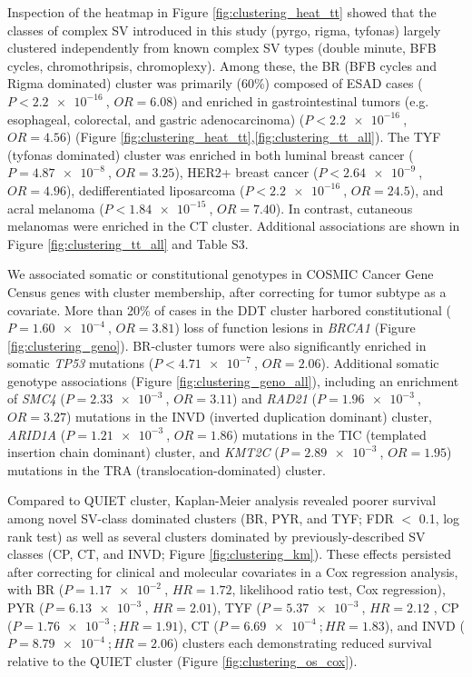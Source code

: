 \documentclass[phd,tocprelim]{cornell}
\begin{document}
Inspection of the heatmap in Figure \ref{fig:clustering_heat_tt} showed that the classes of complex SV introduced in this study (pyrgo, rigma, tyfonas) largely clustered independently from known complex SV types (double minute, BFB cycles, chromothripsis, chromoplexy). Among these, the BR (BFB cycles and Rigma dominated) cluster was primarily (60\%) composed of ESAD cases ($P < \SI{2.2e-16}{}$, $OR = 6.08$) and enriched in gastrointestinal tumors (e.g. esophageal, colorectal, and gastric adenocarcinoma) ($P < \SI{2.2e-16}{}$, $OR = 4.56$) (Figure \ref{fig:clustering_heat_tt},\ref{fig:clustering_tt_all}). The TYF (tyfonas dominated) cluster was enriched in both luminal breast cancer ($P = \SI{4.87e-8}{}$, $OR = 3.25$),  HER2+ breast cancer ($P < \SI{2.64e-9}{}$, $OR = 4.96$), dedifferentiated liposarcoma ($P < \SI{2.2e-16}{}$, $OR = 24.5$), and acral melanoma ($P < \SI{1.84e-15}{}$, $OR = 7.40$). In contrast, cutaneous melanomas were enriched in the CT cluster.  Additional associations are shown in Figure \ref{fig:clustering_tt_all} and \cite{Hadi2020-um} Table S3.

We associated somatic or constitutional genotypes in COSMIC Cancer Gene Census genes with cluster membership, after correcting for tumor subtype as a covariate. More than 20\% of cases in the DDT cluster harbored constitutional ($P = \SI{1.60e-4}{}$, $OR = 3.81$) loss of function lesions in \textit{BRCA1} (Figure \ref{fig:clustering_geno}). BR-cluster tumors were also significantly enriched in somatic \textit{TP53} mutations ($P < \SI{4.71e-7}{}$, $OR = 2.06$). Additional somatic genotype associations (Figure \ref{fig:clustering_geno_all}), including an enrichment of \textit{SMC4} ($P = \SI{2.33e-3}{}$, $OR = 3.11$) and \textit{RAD21} ($P = \SI{1.96e-3}{}$, $OR = 3.27$) mutations in the INVD (inverted duplication dominant) cluster, \textit{ARID1A} ($P = \SI{1.21e-3}{}$, $OR = 1.86$) mutations in the TIC (templated insertion chain dominant) cluster, and \textit{KMT2C} ($P = \SI{2.89e-3}{}$, $OR = 1.95$) mutations in the TRA (translocation-dominated) cluster.

Compared to QUIET cluster, Kaplan-Meier analysis revealed poorer survival among novel SV-class dominated clusters (BR, PYR, and TYF; FDR $<$ 0.1, log rank test) as well as several clusters dominated by previously-described SV classes (CP, CT, and INVD; Figure \ref{fig:clustering_km}). These effects persisted after correcting for clinical and molecular covariates in a Cox regression analysis, with BR ($P = \SI{1.17e-2}{}$, $HR = 1.72$, likelihood ratio test, Cox regression), PYR ($P = \SI{6.13e-3}{}$, $HR = 2.01$), TYF ($P = \SI{5.37e-3}{}$, $HR = 2.12$ , CP ($P = \SI{1.76e-3}{}; HR = 1.91$), CT ($P = \SI{6.69e-4}{}; HR = 1.83$), and INVD ($P = \SI{8.79e-4}{}; HR = 2.06$) clusters each demonstrating reduced survival relative to the QUIET cluster (Figure \ref{fig:clustering_os_cox}).
\end{document}
